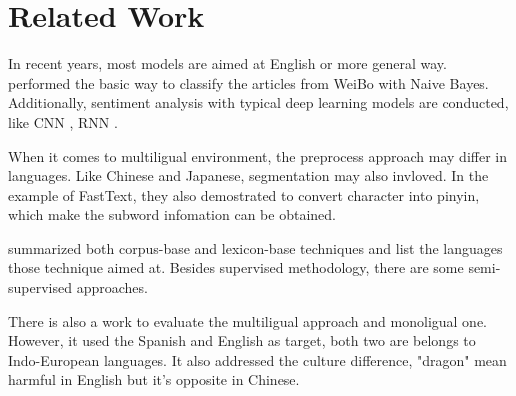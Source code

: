 \chapter{Related Work}

In recent years, most models are aimed at English or more general way. 
\cite{zhao2012moodlens} performed the basic way to classify the articles from WeiBo with Naive Bayes.  \\


Additionally, sentiment analysis with typical deep learning models are conducted, like CNN 
\cite{kim2014convolutional}, RNN \cite{arevian2007recurrent}. 

When it comes to multiligual environment, the preprocess approach may differ in languages. Like Chinese and Japanese, segmentation may also invloved.
In the example of FastText\cite{joulin2016fasttext}, they also demostrated to convert character into pinyin, which make the subword infomation can be obtained. 

\cite{Dashtipour2016} summarized both corpus-base and lexicon-base techniques and list the languages those technique aimed at. 
Besides supervised methodology, there are some semi-supervised approaches.

There is also a work\cite{multilingual} to evaluate the multiligual approach and monoligual one. However, it used the Spanish and English as target, both two are belongs 
to Indo-European languages. It also addressed the culture difference, "dragon" mean harmful in English but it's opposite in Chinese. 
